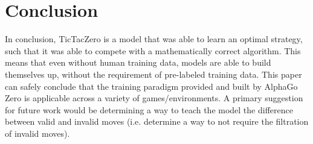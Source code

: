 \section{Conclusion}
In conclusion, TicTacZero is a model that was able to learn an optimal strategy, such that it was able to compete with a mathematically correct algorithm. This means that even without human training data, models are able to build themselves up, without the requirement of pre-labeled training data. This paper can safely conclude that the training paradigm provided and built by AlphaGo Zero is applicable across a variety of games/environments. A primary suggestion for future work would be determining a way to teach the model the difference between valid and invalid moves (i.e. determine a way to not require the filtration of invalid moves).